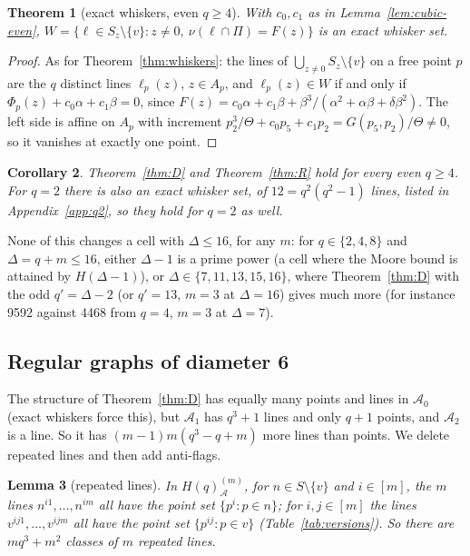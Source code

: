 \documentclass[11pt]{amsart}
\newtheorem{theorem}{Theorem}[section]
\newtheorem{lemma}[theorem]{Lemma}
\newtheorem{corollary}[theorem]{Corollary}
\theoremstyle{definition}
\theoremstyle{remark}
\numberwithin{equation}{section}
\newcommand{\cA}{\mathcal A}
\begin{document}
\begin{theorem}[exact whiskers, even $q\ge4$]\label{thm:whiskers-even}
With $c_0,c_1$ as in Lemma~\ref{lem:cubic-even}, $W=\{\ell\in S_z\setminus\{v\}:z\ne0,\ \nu(\ell\cap\Pi)=F(z)\}$ is an
exact whisker set.
\end{theorem}

\begin{proof}
As for Theorem~\ref{thm:whiskers}: the lines of $\bigcup_{z\ne0}S_z\setminus\{v\}$ on a free point $p$ are the $q$
distinct lines $\ell_p(z)$, $z\in A_p$, and $\ell_p(z)\in W$ if and only if $\Phi_p(z)+c_0\alpha+c_1\beta=0$, since
$F(z)=c_0\alpha+c_1\beta+\beta^3/(\alpha^2+\alpha\beta+\delta\beta^2)$. The left side is affine on $A_p$ with increment
$p_2^3/\Theta+c_0p_5+c_1p_2=G(p_5,p_2)/\Theta\ne0$, so it vanishes at exactly one point.
\end{proof}

\begin{corollary}\label{cor:evenq}
Theorem~\ref{thm:D} and Theorem~\ref{thm:R} hold for every even $q\ge4$. For $q=2$ there is also an exact whisker set, of $12=q^2(q^2-1)$ lines, listed in Appendix~\ref{app:q2}, so they hold for
$q=2$ as well.
\end{corollary}

None of this changes a cell with $\Delta\le16$, for any $m$: for $q\in\{2,4,8\}$ and $\Delta=q+m\le16$, either $\Delta-1$ is
a prime power (a cell where the Moore bound is attained by $H(\Delta-1)$), or $\Delta\in\{7,11,13,15,16\}$, where
Theorem~\ref{thm:D} with the odd $q'=\Delta-2$ (or $q'=13$, $m=3$ at $\Delta=16$) gives much more (for instance 9592
against 4468 from $q=4$, $m=3$ at $\Delta=7$).

\subsection{Regular graphs of diameter 6}\label{ssec:thmR}
The structure of Theorem~\ref{thm:D} has equally many points and lines in $\cA_0$ (exact whiskers force this), but $\cA_1$
has $q^3+1$ lines and only $q+1$ points, and $\cA_2$ is a line. So it has $(m-1)m(q^3-q+m)$ more lines than points. We
delete repeated lines and then add anti-flags.

\begin{lemma}[repeated lines]\label{lem:repeated}
In $H(q)^{(m)}_\cA$, for $n\in S\setminus\{v\}$ and $i\in[m]$, the $m$ lines $n^{i1},\dots,n^{im}$ all have the point set
$\{p^i:p\in n\}$; for $i,j\in[m]$ the lines $v^{ij1},\dots,v^{ijm}$ all have the point set $\{p^{ij}:p\in v\}$
(Table~\ref{tab:versions}). So there are $mq^3+m^2$ classes of $m$ repeated lines.
\end{lemma}
\end{document}
